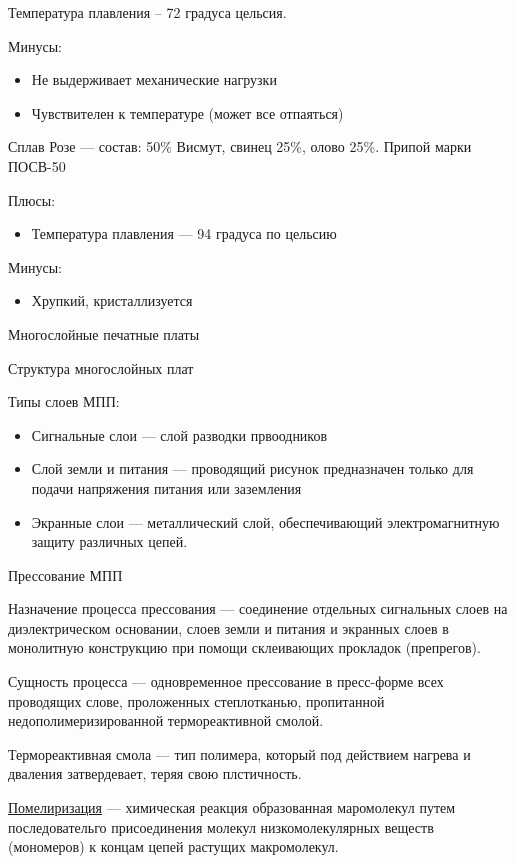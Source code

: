 \documentclass{article}
\begin{document}
Температура плавления -- 72 градуса цельсия.

Минусы:
\begin{itemize}
	\item Не выдерживает механические нагрузки
	\item Чувствителен к температуре (может все отпаяться)
\end{itemize}

Сплав Розе --- состав: 50\% Висмут, свинец 25\%, олово 25\%. Припой марки ПОСВ-50

Плюсы:
\begin{itemize}
	\item Температура плавления --- 94 градуса по цельсию
\end{itemize}

Минусы:
\begin{itemize}
	\item Хрупкий, кристаллизуется
\end{itemize}

Многослойные печатные платы

Структура многослойных плат

Типы слоев МПП:
\begin{itemize}
	\item Сигнальные слои --- слой разводки првоодников
	\item Слой земли и питания --- проводящий рисунок предназначен только для подачи напряжения питания или заземления
	\item Экранные слои --- металлический слой, обеспечивающий электромагнитную защиту различных цепей.
\end{itemize}

Прессование МПП

Назначение процесса прессования --- соединение отдельных сигнальных слоев на диэлектрическом основании, слоев земли и питания и экранных слоев в монолитную конструкцию при помощи склеивающих прокладок (препрегов).

Сущность процесса --- одновременное прессование в пресс-форме всех проводящих слове, проложенных степлотканью, пропитанной недополимеризированной термореактивной смолой.

Термореактивная смола --- тип полимера, который под действием нагрева и дваления затвердевает, теряя свою плстичность.

\underline{Помелиризация}  --- химическая реакция образованная маромолекул путем последовательго присоединения молекул низкомолекулярных веществ (мономеров) к концам цепей растущих макромолекул.
\end{document}
